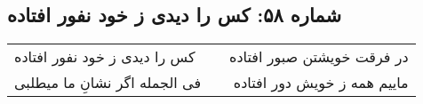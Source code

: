 \begin{center}
\section*{شماره ۵۸: کس را دیدی ز خود نفور افتاده}
\label{sec:058}
\begin{longtable}{l p{0.5cm} r}
کس را دیدی ز خود نفور افتاده
&&
در فرقت خویشتن صبور افتاده
\\
فی الجمله اگر نشانِ ما میطلبی
&&
ماییم همه ز خویش دور افتاده
\\
\end{longtable}
\end{center}
